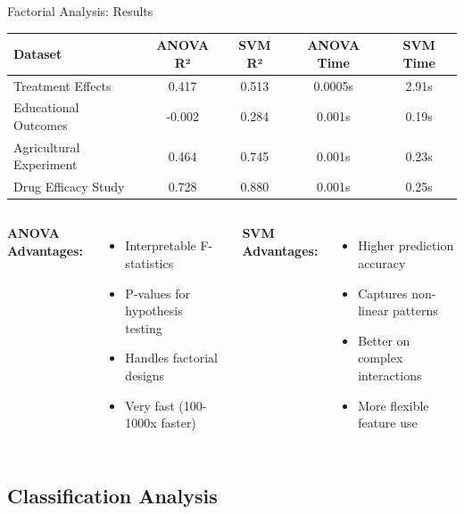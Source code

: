 \documentclass[aspectratio=169,10pt]{beamer}
\begin{document}
\begin{frame}{Factorial Analysis: Results}
\begin{center}
\begin{tabular}{lcccc}
\toprule
\textbf{Dataset} & \textbf{ANOVA R²} & \textbf{SVM R²} & \textbf{ANOVA Time} & \textbf{SVM Time} \\
\midrule
Treatment Effects & 0.417 & \textcolor{mlcolor}{0.513} & 0.0005s & 2.91s \\
Educational Outcomes & -0.002 & \textcolor{mlcolor}{0.284} & 0.001s & 0.19s \\
Agricultural Experiment & 0.464 & \textcolor{mlcolor}{0.745} & 0.001s & 0.23s \\
Drug Efficacy Study & 0.728 & \textcolor{mlcolor}{0.880} & 0.001s & 0.25s \\
\bottomrule
\end{tabular}
\end{center}

\vspace{0.5cm}

\begin{columns}
\textcolor{statcolor}{\textbf{ANOVA Advantages:}}
\begin{itemize}
    \item Interpretable F-statistics
    \item P-values for hypothesis testing
    \item Handles factorial designs
    \item Very fast (100-1000x faster)
\end{itemize}

\textcolor{mlcolor}{\textbf{SVM Advantages:}}
\begin{itemize}
    \item Higher prediction accuracy
    \item Captures non-linear patterns
    \item Better on complex interactions
    \item More flexible feature use
\end{itemize}
\end{columns}
\end{frame}

\subsection{Classification Analysis}
\end{document}
